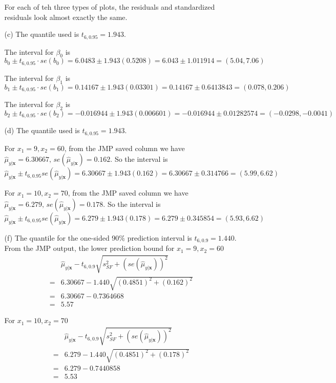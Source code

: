 \documentclass{article}\usepackage[]{graphicx}\usepackage[]{color}
\begin{document}
\begin{enumerate}
\begin{itemize}
  For each of teh three types of plots, the residuals and standardized residuals look almost exactly the same.
  
  \item[(c)] The quantile used is $t_{6, 0.95} = 1.943$.
  
  The interval for $\beta_0$ is
  \[b_0 \pm t_{6, 0.95} \cdot se(b_0) = 6.0483 \pm 1.943(0.5208) = 6.043 \pm 1.011914 = (5.04, 7.06)\]
  
  The interval for $\beta_1$ is
  \[b_1 \pm t_{6, 0.95} \cdot se(b_1) = 0.14167 \pm 1.943(0.03301) = 0.14167 \pm 0.6413843 = (0.078, 0.206)\]
  
  The interval for $\beta_2$ is
  \[b_2 \pm t_{6, 0.95} \cdot se(b_2) = -0.016944 \pm 1.943(0.006601) = -0.016944 \pm 0.01282574 = (-0.0298, -0.0041)\]
  
  \item[(d)] The quantile used is $t_{6, 0.95} = 1.943$.
  
  For $x_1 = 9, x_2 = 60$, from the JMP saved column we have $\hat{\mu}_{y|\bm x} = 6.30667,\, se(\hat{\mu}_{y|\bm x}) = 0.162$. So the interval is
  \[\hat{\mu}_{y|\bm x} \pm t_{6, 0.95} se(\hat{\mu}_{y|\bm x}) = 6.30667 \pm 1.943(0.162) = 6.30667 \pm 0.314766 = (5.99, 6.62)\]
  
  For $x_1 = 10, x_2 = 70$, from the JMP saved column we have $\hat{\mu}_{y|\bm x} = 6.279,\, se(\hat{\mu}_{y|\bm x}) = 0.178$. So the interval is
  \[\hat{\mu}_{y|\bm x} \pm t_{6, 0.95} se(\hat{\mu}_{y|\bm x}) = 6.279 \pm 1.943(0.178) = 6.279 \pm 0.345854 = (5.93, 6.62)\]
  
  \item[(f)]
  The quantile for the one-sided 90\% prediction interval is $t_{6, 0.9} = 1.440$. From the JMP output, the lower prediction bound for $x_1 = 9, x_2 = 60$
  \begin{align*}
  &\hat{\mu}_{y|\bm x} - t_{6, 0.9} \sqrt{s_{SF}^2 + (se(\hat{\mu}_{y|\bm x}))^2}\\
  =&  6.30667 - 1.440 \sqrt{(0.4851)^2 + (0.162)^2}\\
  =& 6.30667 - 0.7364668 \\
  =& 5.57
  \end{align*}
  
  For $x_1 = 10, x_2 = 70$
  \begin{align*}
  &\hat{\mu}_{y|\bm x} - t_{6, 0.9} \sqrt{s_{SF}^2 + (se(\hat{\mu}_{y|\bm x}))^2}\\
  =&  6.279 - 1.440 \sqrt{(0.4851)^2 + (0.178)^2}\\
  =& 6.279 - 0.7440858 \\
  =& 5.53
  \end{align*}
  

\end{itemize}
\end{enumerate}
\end{document}
